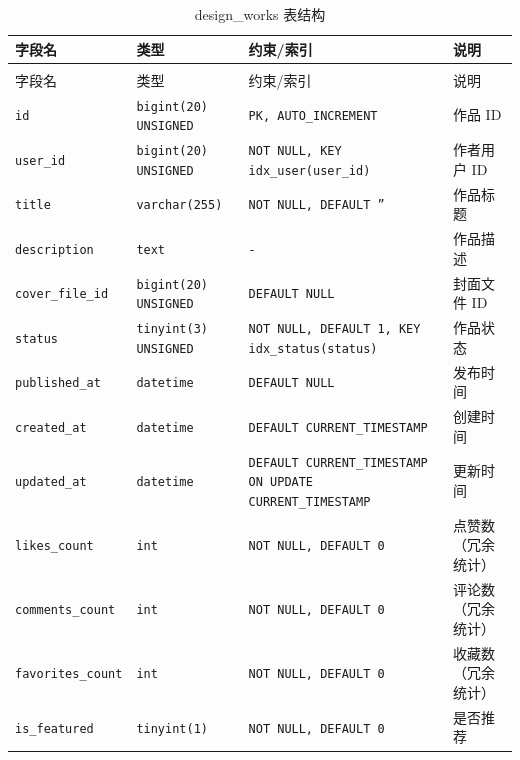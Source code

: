\documentclass[twoside]{thesis-cls-Miya} %
\begin{document}
{
\renewcommand{\arraystretch}{1.25}
\setlength{\tabcolsep}{0.2ex}
\begin{longtable}{@{}>{\raggedright\arraybackslash}p{} >{\raggedright\arraybackslash}p{} >{\raggedright\arraybackslash}p{} >{\raggedright\arraybackslash}p{}@{}}
\caption{design\_works 表结构}\label{tab:design-works}\\
\toprule
字段名 & 类型 & 约束/索引 & 说明 \\
\midrule
\endfirsthead

\multicolumn{4}{c}{\zihao{5}续表\thetable\quad design\_works 表结构}\\
\toprule
字段名 & 类型 & 约束/索引 & 说明 \\
\midrule
\endhead

\bottomrule
\endfoot

\bottomrule
\endlastfoot

\texttt{id} & \texttt{bigint(20) UNSIGNED} & \texttt{PK, AUTO\_INCREMENT} & 作品 ID \\
\texttt{user\_\allowbreak id} & \texttt{bigint(20) UNSIGNED} & \texttt{NOT NULL, KEY idx\_user(user\_id)} & 作者用户 ID \\
\texttt{title} & \texttt{varchar(255)} & \texttt{NOT NULL, DEFAULT ''} & 作品标题 \\
\texttt{description} & \texttt{text} & \texttt{-} & 作品描述 \\
\texttt{cover\_\allowbreak file\_\allowbreak id} & \texttt{bigint(20) UNSIGNED} & \texttt{DEFAULT NULL} & 封面文件 ID \\
\texttt{status} & \texttt{tinyint(3) UNSIGNED} & \texttt{NOT NULL, DEFAULT 1, KEY idx\_status(status)} & 作品状态 \\
\texttt{published\_\allowbreak at} & \texttt{datetime} & \texttt{DEFAULT NULL} & 发布时间 \\
\texttt{created\_\allowbreak at} & \texttt{datetime} & \texttt{DEFAULT CURRENT\_TIMESTAMP} & 创建时间 \\
\texttt{updated\_\allowbreak at} & \texttt{datetime} & \texttt{DEFAULT CURRENT\_TIMESTAMP ON UPDATE CURRENT\_TIMESTAMP} & 更新时间 \\
\texttt{likes\_\allowbreak count} & \texttt{int} & \texttt{NOT NULL, DEFAULT 0} & 点赞数（冗余统计） \\
\texttt{comments\_\allowbreak count} & \texttt{int} & \texttt{NOT NULL, DEFAULT 0} & 评论数（冗余统计） \\
\texttt{favorites\_\allowbreak count} & \texttt{int} & \texttt{NOT NULL, DEFAULT 0} & 收藏数（冗余统计） \\
\texttt{is\_\allowbreak featured} & \texttt{tinyint(1)} & \texttt{NOT NULL, DEFAULT 0} & 是否推荐 \\
\end{longtable}
}
\end{document}
